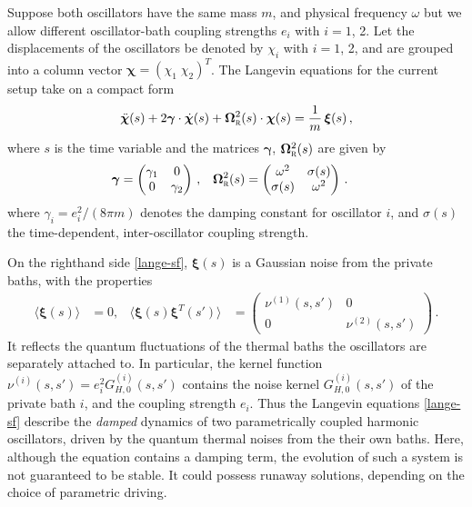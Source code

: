 \documentclass[11pt,a4paper]{article}
\begin{document}
Suppose both oscillators have the same mass $m$, and physical frequency $\omega$ but we allow different oscillator-bath coupling strengths $e_{i}$ with $i=1$, 2. Let the displacements of the oscillators be denoted by $\chi_{i}$ with $i=1$, 2, and are grouped into a column vector $\bm{\chi}=(\chi_{1}\;\chi_{2})^{T}$. The Langevin equations for the current setup take on a compact form
\begin{align}
	\ddot{\bm{\chi}}(s) + 2\bm{\gamma} \cdot \dot{\bm{\chi}}(s) + \bm{\Omega}^2_{\textsc{r}}(s) \cdot \bm{\chi}(s) = \frac{1}{m}\, \bm{\xi}(s) \label{lange-sf}\,,
\end{align}
where $s$ is the time variable and the matrices $\bm{\gamma}$, $\bm{\Omega}^2_{\textsc{r}}(s)$ are given by
\begin{align}
	\bm{\gamma} &= \begin{pmatrix} \gamma_{1} &0  \\ 0 &\gamma_{2} \end{pmatrix}\,,&\bm{\Omega}^2_{\textsc{r}}(s) &=\begin{pmatrix} \omega^2 &\sigma(s) \\ \sigma(s) &\omega^2 \end{pmatrix}\, .
\end{align}
where $\gamma_{i}=e^2_i/(8\pi m)$ denotes the damping constant for oscillator $i$, and $\sigma(s)$ the time-dependent, inter-oscillator coupling strength.

On the righthand side \eqref{lange-sf}, $\bm{\xi}(s)$ is a Gaussian noise from the private baths, with the properties
\begin{align}
	\langle \bm{\xi}(s) \rangle &= 0, &\langle \bm{\xi}(s) \bm{\xi}^{T}(s') \rangle &= \begin{pmatrix} \nu^{(1)}(s,s') &0 \\  0 & \nu^{(2)}(s,s') \end{pmatrix} \label{xi-covar}\,.
\end{align}
It reflects the quantum fluctuations of the thermal baths the oscillators are separately attached to. In particular, the kernel function $\nu^{(i)}(s,s')=e_{i}^{2}G_{H,0}^{(i)}(s,s')$ contains the noise kernel $G_{H,0}^{(i)}(s,s')$ of the private bath $i$, and the coupling strength $e_{i}$. Thus the Langevin equations \eqref{lange-sf} describe the \textit{damped} dynamics of two parametrically coupled harmonic oscillators, driven by the quantum thermal noises from the their own baths. Here, although the equation contains a damping term, the evolution of such a system is not guaranteed to be stable. It could possess runaway solutions, depending on the choice of parametric driving. 
\end{document}
